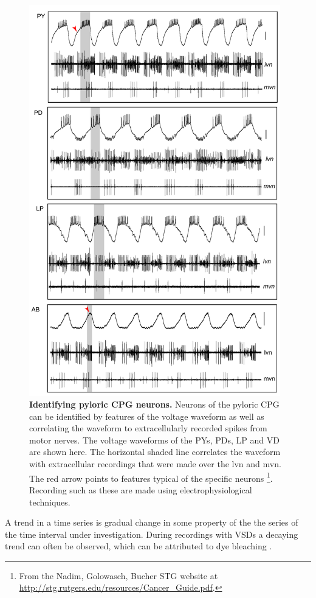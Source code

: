 \begin{figure}[H]
	\centering
		\includegraphics[height=17cm]{graphics/ident_neurons.png}
		\caption[Identifying pyloric \ac{CPG} neurons.]{\textbf{Identifying pyloric \ac{CPG} neurons.} Neurons of the pyloric \ac{CPG} can be identified by features of the voltage waveform as well as correlating the waveform to extracellularly recorded spikes from motor nerves. The voltage waveforms of the \acp{PY}, \acp{PD}, \ac{LP} and \ac{VD} are shown here. The horizontal shaded line correlates the waveform with extracellular recordings that were made over the \ac{lvn} and \ac{mvn}. The red arrow points to features typical of the specific neurons \footnote{From the Nadim, Golowasch, Bucher STG website at \url{http://stg.rutgers.edu/resources/Cancer_Guide.pdf}.}. Recording such as these are made using electrophysiological techniques.}
		\label{fig:ident_neurons}
\end{figure}

A trend in a time series is gradual change in some property of the the series of the time interval under investigation. During recordings with \acp{VSD} a decaying trend can often be observed, which can be attributed to dye bleaching \cite{Briggman2010}. 


